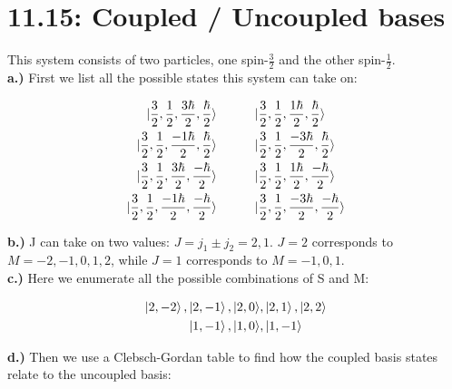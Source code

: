 \documentclass[10pt]{article} %
\begin{document}
\section{11.15: Coupled / Uncoupled bases}
This system consists of two particles, one spin-$\frac{3}{2}$ and the other
spin-$\frac{1}{2}$.\\

\textbf{a.)} First we list all the possible states this system can take on:

\begin{align*}
  \ket{\frac{3}{2},\frac{1}{2},\frac{3\hbar}{2},\frac{\hbar}{2}}\hspace{1cm}&
  \ket{\frac{3}{2},\frac{1}{2},\frac{1\hbar}{2},\frac{\hbar}{2}}\\
  \ket{\frac{3}{2},\frac{1}{2},\frac{-1\hbar}{2},\frac{\hbar}{2}}\hspace{1cm}&
  \ket{\frac{3}{2},\frac{1}{2},\frac{-3\hbar}{2},\frac{\hbar}{2}}\\
  \ket{\frac{3}{2},\frac{1}{2},\frac{3\hbar}{2},\frac{-\hbar}{2}}\hspace{1cm}&
  \ket{\frac{3}{2},\frac{1}{2},\frac{1\hbar}{2},\frac{-\hbar}{2}}\\
  \ket{\frac{3}{2},\frac{1}{2},\frac{-1\hbar}{2},\frac{-\hbar}{2}}\hspace{1cm}&
  \ket{\frac{3}{2},\frac{1}{2},\frac{-3\hbar}{2},\frac{-\hbar}{2}}\\
\end{align*}

\textbf{b.)} J can take on two values: $J = j_1 \pm j_2 = 2, 1$. $J=2$ corresponds to
$M = -2, -1, 0, 1, 2$, while $J=1$ corresponds to $M=-1, 0, 1$.\\

\textbf{c.)} Here we enumerate all the possible combinations of S and M:

\begin{align*}
  \ket{2,-2}, \ket{2,-1}, \ket{2,0}&, \ket{2,1}, \ket{2,2}\\
  \ket{1,-1}, \ket{1,0}&, \ket{1,-1}\\
\end{align*}

\textbf{d.)} Then we use a Clebsch-Gordan table to find how the coupled basis states
relate to the uncoupled basis:
\end{document}

